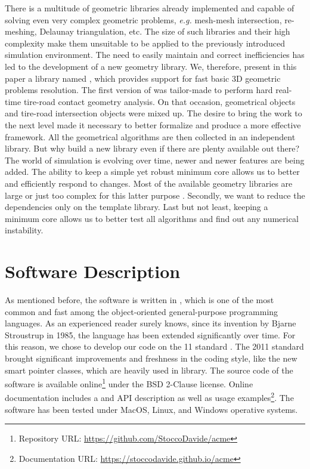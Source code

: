 There is a multitude of geometric libraries already implemented and capable of solving even very complex geometric problems, \emph{e.g.} mesh-mesh intersection, re-meshing, Delaunay triangulation, etc. The size of such libraries and their high complexity make them unsuitable to be applied to the previously introduced simulation environment. The need to easily maintain and correct inefficiencies has led to the development of a new geometry library. We, therefore, present in this paper a \cpp{} library named \Acme{}, which provides support for fast basic 3D geometric problems resolution. The first version of \Acme{} was tailor-made to perform hard real-time tire-road contact geometry analysis. On that occasion, geometrical objects and tire-road intersection objects were mixed up. The desire to bring the work to the next level made it necessary to better formalize and produce a more effective framework. All the geometrical algorithms are then collected in an independent library. But why build a new library even if there are plenty available out there? The world of simulation is evolving over time, newer and newer features are being added. The ability to keep a simple yet robust minimum core allows us to better and efficiently respond to changes. Most of the available geometry libraries are large or just too complex for this latter purpose \cite{cgal2023cgal, libigl2018libigl}. Secondly, we want to reduce the dependencies only on the \cpp{} \Eigen{} template library. Last but not least, keeping a minimum core allows us to better test all algorithms and find out any numerical instability.


\section{Software Description}

As mentioned before, the software is written in \cpp{}, which is one of the most common and fast among the object-oriented general-purpose programming languages. As an experienced reader surely knows, since its invention by Bjarne Stroustrup in 1985, the language has been extended significantly over time. For this reason, we chose to develop our code on the \cpp{}11 standard \cite{stroustrup2013cpp}. The 2011 standard brought significant improvements and freshness in the coding style, like the new smart pointer classes, which are heavily used in \Acme{} library. The source code of the software is available online\footnote{Repository URL: \url{https://github.com/StoccoDavide/acme}} under the BSD 2-Clause license. Online documentation includes a \cpp{} and \Matlab{} \Mex{} API description as well as usage examples\footnote{Documentation URL: \url{https://stoccodavide.github.io/acme}}. The software has been tested under MacOS, Linux, and Windows operative systems.


